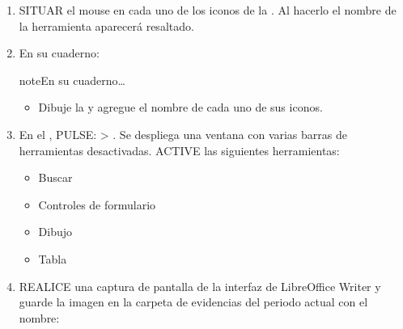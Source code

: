 \documentclass[letterpaper,10pt,spanish]{sphinxmanual}
\let\sphinxpxdimen\pdfpxdimen\else\newdimen\sphinxpxdimen
\begin{document}
\begin{enumerate}
\begin{savenotes}
\begin{tabulary}{\linewidth}[t]{T}
\begin{sphinxfigure-in-table}
\centering
\capstart
\noindent\sphinxincludegraphics[width=700\sphinxpxdimen]{{image122}.png}
\label{\detokenize{1_guias/10ofimatica/G1013:id7}}\end{sphinxfigure-in-table}\relax
\\
\sphinxbottomrule
\end{tabulary}
\sphinxtableafterendhook\par
\sphinxattableend\end{savenotes}

\item {} 
\sphinxAtStartPar
SITUAR el mouse en cada uno de los iconos de la . Al hacerlo el nombre de la herramienta aparecerá resaltado.

\item {} 
\sphinxAtStartPar
En su cuaderno:

\begin{sphinxadmonition}{note}{En su cuaderno…}
\begin{itemize}
\item {} 
\sphinxAtStartPar
Dibuje la  y agregue el nombre de cada uno de sus iconos.

\end{itemize}
\end{sphinxadmonition}

\item {} 
\sphinxAtStartPar
En el , PULSE:  > . Se despliega una ventana con varias barras de herramientas desactivadas. ACTIVE las siguientes herramientas:
\begin{itemize}
\item {} 
\sphinxAtStartPar
Buscar

\item {} 
\sphinxAtStartPar
Controles de formulario

\item {} 
\sphinxAtStartPar
Dibujo

\item {} 
\sphinxAtStartPar
Tabla

\end{itemize}

\item {} 
\sphinxAtStartPar
REALICE una captura de pantalla de la interfaz de LibreOffice Writer y guarde la imagen en la carpeta de evidencias del periodo actual con el nombre: 


\end{enumerate}
\end{document}
